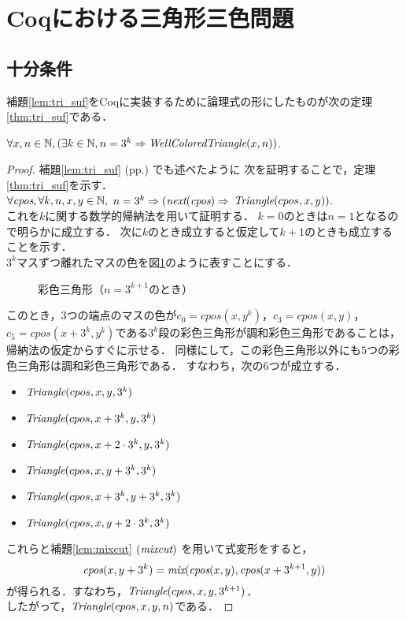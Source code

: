 \section{Coqにおける三角形三色問題}

\subsection{十分条件}
補題\ref{lem:tri_suf}をCoqに実装するために論理式の形にしたものが次の定理\ref{thm:tri_suf}である．
\begin{thm}[十分条件] \label{thm:tri_suf}
  $\forall x, n \in \mathbb{N}, (\exists k \in \mathbb{N}, n = 3 ^ k \Rightarrow \textit{WellColoredTriangle}(x,n))$.
\end{thm}
\begin{proof}
  補題\ref{lem:tri_suf} (pp.\pageref{lem:tri_suf}) でも述べたように
  次を証明することで，定理\ref{thm:tri_suf}を示す．\\
  $\forall \textit{cpos}, \forall k, n, x, y \in \mathbb{N},$ $n = 3^k \Rightarrow (\textit{next}(\textit{cpos}) \Rightarrow$ $\textit{Triangle}(cpos,x,y)).$ \\
  これを$k$に関する数学的帰納法を用いて証明する．
  $k=0$のときは$n=1$となるので明らかに成立する．
  次に$k$のとき成立すると仮定して$k+1$のときも成立することを示す．\\
  $3^k$マスずつ離れたマスの色を図\ref{fig:suf_steps}のように表すことにする．
  \begin{figure}[h]
    \centering
    
    \caption{彩色三角形（$n=3^{k+1}$のとき）}
    \label{fig:suf_steps}
  \end{figure}
  このとき，$3$つの端点のマスの色が$c_0=cpos(x,y^k)$，$c_3=cpos(x,y)$，
  $c_5=cpos(x+3^k,y^k)$である$3^k$段の彩色三角形が調和彩色三角形であることは，
  帰納法の仮定からすぐに示せる．
  同様にして，この彩色三角形以外にも$5$つの彩色三角形は調和彩色三角形である．
  すなわち，次の$6$つが成立する．
  \begin{itemize}
    \item $\textit{Triangle}(cpos,x,y,3^k)$
    \item $\textit{Triangle}(cpos,x+3^k,y,3^k)$
    \item $\textit{Triangle}(cpos,x+2\cdot3^k,y,3^k)$
    \item $\textit{Triangle}(cpos,x,y+3^k,3^k)$
    \item $\textit{Triangle}(cpos,x+3^k,y+3^k,3^k)$
    \item $\textit{Triangle}(cpos,x,y+2\cdot3^k,3^k)$
  \end{itemize}
  これらと補題\ref{lem:mixcut} $(\textit{mixcut})$ を用いて式変形をすると，
  \[
  \textit{cpos}(x,y+3^k)=\textit{mix}(\textit{cpos}(x,y),\textit{cpos}(x+3^{k+1},y))
  \]
  が得られる．すなわち，$\textit{Triangle}(cpos,x,y,3^{k+1})$．\\
  したがって，$\textit{Triangle}(cpos,x,y,n)$である．
\end{proof}

